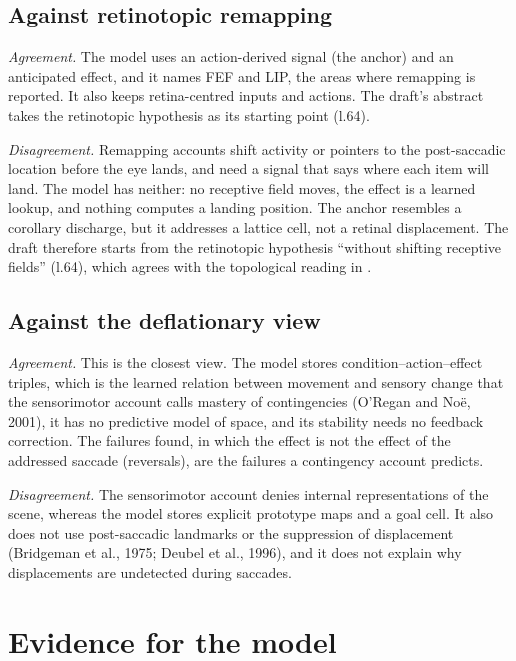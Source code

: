 \documentclass[11pt,a4paper]{article}
\newcommand{\code}[1]{\path{#1}}
\begin{document}
\subsection{Against retinotopic remapping}

\emph{Agreement.} The model uses an action-derived signal (the anchor) and an
anticipated effect, and it names FEF and LIP, the areas where remapping is
reported. It also keeps retina-centred inputs and actions. The draft's abstract
takes the retinotopic hypothesis as its starting point (l.64).

\emph{Disagreement.} Remapping accounts shift activity or pointers to the
post-saccadic location before the eye lands, and need a signal that says where each
item will land. The model has neither: no receptive field moves, the effect is a
learned lookup, and nothing computes a landing position. The anchor resembles a
corollary discharge, but it addresses a lattice cell, not a retinal displacement.
The draft therefore starts from the retinotopic hypothesis ``without shifting
receptive fields'' (l.64), which agrees with the topological reading in
\code{docs/topological_stability.tex}.

\subsection{Against the deflationary view}

\emph{Agreement.} This is the closest view. The model stores condition--action--effect
triples, which is the learned relation between movement and sensory change that the
sensorimotor account calls mastery of contingencies (O'Regan and No\"e, 2001), it
has no predictive model of space, and its stability needs no feedback correction.
The failures found, in which the effect is not the effect of the addressed saccade
(reversals), are the failures a contingency account predicts.

\emph{Disagreement.} The sensorimotor account denies internal representations of
the scene, whereas the model stores explicit prototype maps and a goal cell. It also
does not use post-saccadic landmarks or the suppression of displacement
(Bridgeman et al., 1975; Deubel et al., 1996), and it does not explain why displacements
are undetected during saccades.

\section{Evidence for the model}
\end{document}

